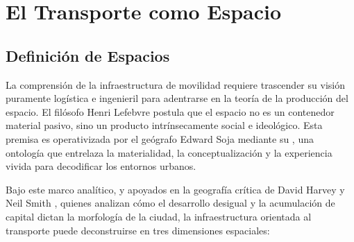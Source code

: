 \section{El Transporte como Espacio}
\label{sec:transporte-espacio}

\subsection{Definición de Espacios}
\label{ssec:definicion-espacio}

La comprensión de la infraestructura de movilidad requiere trascender su visión puramente 
logística e ingenieril para adentrarse en la teoría de la producción del espacio. 
El filósofo Henri Lefebvre \cite{lefebvre2013produccion} postula que el espacio no es un 
contenedor material pasivo, sino un producto intrínsecamente social e ideológico. 
Esta premisa es operativizada por el geógrafo Edward Soja \cite{soja1996thirdspace} 
mediante su , una ontología que entrelaza la materialidad, 
la conceptualización y la experiencia vivida para decodificar los entornos urbanos.

Bajo este marco analítico, y apoyados en la geografía crítica de David Harvey 
\cite{harvey2007espacios} y Neil Smith \cite{smith2020desarrollo}, quienes analizan 
cómo el desarrollo desigual y la acumulación de capital dictan la morfología de la ciudad, 
la infraestructura orientada al transporte puede deconstruirse en tres dimensiones espaciales:

